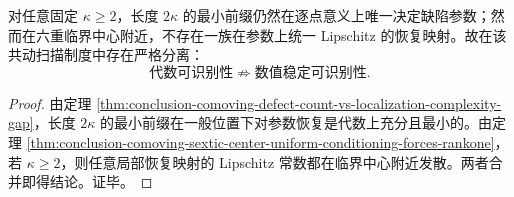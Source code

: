 \begin{corollary}[代数可识别性与数值可识别性在临界中心处分裂]\label{cor:conclusion-comoving-algebraic-vs-numerical-identifiability-split}
对任意固定 \(\kappa\ge 2\)，长度 \(2\kappa\) 的最小前缀仍然在逐点意义上唯一决定缺陷参数；然而在六重临界中心附近，不存在一族在参数上统一 Lipschitz 的恢复映射。故在该共动扫描制度中存在严格分离：
\[
\text{代数可识别性}
\not\Rightarrow
\text{数值稳定可识别性}.
\]
\end{corollary}
\begin{proof}
由定理 \ref{thm:conclusion-comoving-defect-count-vs-localization-complexity-gap}，长度 \(2\kappa\) 的最小前缀在一般位置下对参数恢复是代数上充分且最小的。由定理 \ref{thm:conclusion-comoving-sextic-center-uniform-conditioning-forces-rankone}，若 \(\kappa\ge 2\)，则任意局部恢复映射的 Lipschitz 常数都在临界中心附近发散。两者合并即得结论。证毕。
\end{proof}
